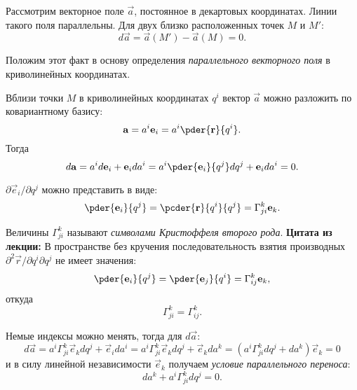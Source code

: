 Рассмотрим векторное поле \( \vec{a} \), постоянное в декартовых координатах.
Линии такого поля параллельны. Для двух близко расположенных точек \( M \) и
\( M' \):
\[
    d\vec{a} = \vec{a}(M') - \vec{a}(M) = 0.
\]
    
Положим этот факт в основу определения \emph{параллельного векторного поля} в
криволинейных координатах.

Вблизи точки \( M \) в криволинейных координатах \( q^i \) вектор \( \vec{a} \)
можно разложить по ковариантному базису:
\[
    \vec{a} = a^i \vec{e}_{i} = a^i \pder{\vec{r}}{q^i}.
\]
Тогда
\[
    d\vec{a} = a^i d\vec{e}_{i} + \vec{e}_{i} da^i  = 
    a^i \pder{\vec{e}_{i}}{q^j} dq^j + \vec{e}_{i} da^i = 0.
\]
    
\( \partial\vec{e}_{i}/{\partial q^j} \) можно представить в виде:
\[
    \pder{\vec{e}_{i}}{q^j} = 
    \pcder{\vec{r}}{q^i}{q^j} =
    \Gamma^k_{ji} \vec{e}_{k}.
\]

Величины \( \Gamma^k_{ji} \) называют \emph{символами Кристоффеля второго рода}.
\textbf{Цитата из лекции:} В пространстве без кручения последовательность
взятия производных \( \partial^2{\vec{r}}/{\partial q^i \partial  q^j} \) не
имеет значения:
\[
    \pder{\vec{e}_{i}}{q^j} = 
    \pder{\vec{e}_{j}}{q^i} =
    \Gamma^k_{ij} \vec{e}_{k},
\]
откуда
\[
    \Gamma^k_{ji} = \Gamma^k_{ij}.
\]

Немые индексы можно менять, тогда для \( d\vec{a} \):
\[
    d\vec{a} = 
    a^i \Gamma^k_{ji} \vec{e}_{k} dq^j + \vec{e}_{i} da^i = 
    a^i \Gamma^k_{ji} \vec{e}_{k} dq^j + \vec{e}_{k} da^k =
    \left(a^i \Gamma^k_{ji} dq^j + da^k\right)\vec{e}_{k}  =
    0
\]
и в силу линейной независимости \( \vec{e}_{k} \) получаем \emph{условие
параллельного переноса}:
\[
    da^k + a^i \Gamma^k_{ji} dq^j  = 0.
\]
    
